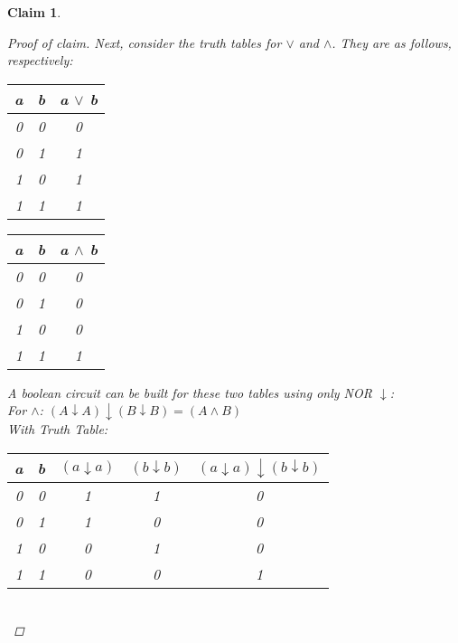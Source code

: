 \documentclass{exam} %
\theoremstyle{plain}
\newtheorem{claim}[thm]{Claim}      \newtheorem*{claim*}{Claim}
\theoremstyle{definition}
\theoremstyle{remark}
\newenvironment{claimproof} {
  \begin{proof}[Proof of claim]
  \renewcommand{\qedsymbol}{\ensuremath{\bullet}}
  } {
  \end{proof}
  }
\numberwithin{equation}{section}  %
\begin{document}
\begin{questions}
\begin{claim}
\begin{claimproof}
      Next, consider the truth tables for $\lor$ and $\land$. They are
      as follows, respectively:\\ 
      \begin{tabular}{cc|c}
        a & b & a $\lor$ b \\
        \hline
        0 & 0 & 0 \\
        0 & 1 & 1 \\
        1 & 0 & 1 \\
        1 & 1 & 1 \\
      \end{tabular}
      \qquad
      \begin{tabular}{cc|c}
        a & b & a $\land$ b \\
        \hline
        0 & 0 & 0 \\
        0 & 1 & 0 \\
        1 & 0 & 0 \\
        1 & 1 & 1 \\
      \end{tabular}

      A boolean circuit can be built for these two tables using only 
      NOR $\downarrow$:\\

      For $\land$: $(A \downarrow A) \downarrow (B \downarrow B) = (A \land B)$\\ 
      With Truth Table:\\
      \begin{tabular}{cc|c|c|c}
        a & b & $(a \downarrow a)$ & $(b \downarrow b)$ & $(a \downarrow a) \downarrow 
        (b \downarrow b)$\\
        \hline
        0 & 0 & 1 & 1 & 0 \\
        0 & 1 & 1 & 0 & 0 \\
        1 & 0 & 0 & 1 & 0\\
        1 & 1 & 0 & 0 & 1\\
      \end{tabular}\\

      \smallskip


\end{claimproof}
\end{claim}
\end{questions}
\end{document}

